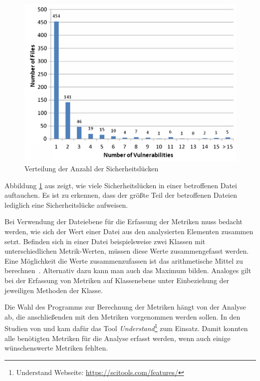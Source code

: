 \begin{figure}
	\includegraphics[width=\textwidth]{img/vulnerability_distribution.png}
	\caption{Verteilung der Anzahl der Sicherheitslücken \cite{chowdhury_zulkernine_2009}}
	\label{fig:vulnerability_distribution}
\end{figure}
Abbildung \ref{fig:vulnerability_distribution} aus \cite{chowdhury_zulkernine_2009} zeigt, wie viele Sicherheitslücken in einer betroffenen Datei auftauchen.
Es ist zu erkennen, dass der größte Teil der betroffenen Dateien lediglich eine Sicherheitslücke aufweisen.

Bei Verwendung der Dateiebene für die Erfassung der Metriken muss bedacht werden, wie sich der Wert einer Datei aus den analysierten Elementen zusammen setzt.
Befinden sich in einer Datei beispielsweise zwei Klassen mit unterschiedlichen Metrik-Werten, müssen diese Werte zusammengefasst werden.
Eine Möglichkeit die Werte zusammenzufassen ist das arithmetische Mittel zu berechnen~\cite{chowdhury_zulkernine_2009}.
Alternativ dazu kann man auch das Maximum bilden.
Analoges gilt bei der Erfassung von Metriken auf Klassenebene unter Einbeziehung der jeweiligen Methoden der Klasse.

Die Wahl des Programms zur Berechnung der Metriken hängt von der Analyse ab, die anschließenden mit den Metriken vorgenommen werden sollen.
In den Studien von \cite{alves_et_al} und \cite{chowdhury_zulkernine_2009} kam dafür das Tool \emph{Understand}\footnote{Understand Webseite: \url{https://scitools.com/features/}} zum Einsatz.
Damit konnten alle benötigten Metriken für die Analyse erfasst werden, wenn auch einige wünschenswerte Metriken fehlten.
